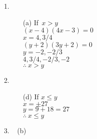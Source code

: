 \begin{multicols}{2}
\begin{enumerate}
\item
\begin{itemize}
\item[(a)] If\ $x > y$\\
 $(x - 4)(4x - 3) = 0$\\
 $x = 4, 3/4$\\
 $(y + 2)(3y + 2) = 0$\\
 $y = -2, -2/3$\\
 $4, 3/4, -2/3, -2$\\
$\therefore~ x > y$
\end{itemize}
\item
\begin{itemize}
\item[(d)] If $x \leq y$\\
  $x = \pm 27$\\
  $y = 9 + 18 = 27$\\
$\therefore~ x \leq y$
\end{itemize}
\item~ (b)


\end{enumerate}
\end{multicols}
